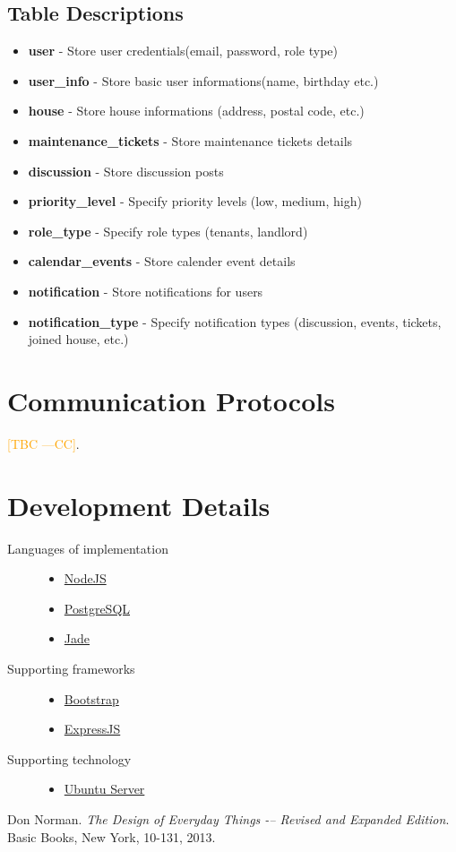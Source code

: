 \documentclass[12pt]{article}
\newcommand{\authornote}[3]{\textcolor{#1}{[#3 ---#2]}}
\newcommand{\authornote}[3]{}
\newcommand{\cc}[1]{\authornote{orange}{CC}{#1}}
\begin{document}
\subsection{Table Descriptions}
\begin{itemize}
    \item \textbf{user} - Store user credentials(email, password, role type)
    \item \textbf{user\_info} - Store basic user informations(name, birthday etc.)
    \item \textbf{house} - Store house informations (address, postal code, etc.)
    \item \textbf{maintenance\_tickets} - Store maintenance tickets details
    \item \textbf{discussion} - Store discussion posts
    \item \textbf{priority\_level} - Specify priority levels (low, medium, high)
    \item \textbf{role\_type} - Specify role types (tenants, landlord)
    \item \textbf{calendar\_events} - Store calender event details
    \item \textbf{notification} - Store notifications for users
    \item \textbf{notification\_type} - Specify notification types (discussion, events, tickets, joined house, etc.)

\end{itemize}

\section{Communication Protocols}
\cc{TBC}.

%
\section{Development Details}
\begin{description}
  \item[Languages of implementation] \hfill
    \begin{itemize}
      \item \href{https://nodejs.org/en/}{NodeJS}
      \item \href{http://www.postgresql.org/}{PostgreSQL}
      \item \href{http://jade-lang.com/}{Jade}
    \end{itemize}
  \item[Supporting frameworks] \hfill
    \begin{itemize}
      \item \href{http://getbootstrap.com/}{Bootstrap}
      \item \href{http://expressjs.com/}{ExpressJS}
    \end{itemize}
  \item[Supporting technology] \hfill
    \begin{itemize}
      \item \href{http://www.ubuntu.com/server}{Ubuntu Server}
    \end{itemize}
\end{description}

\begin{thebibliography}{9}
Don Norman.
\textit{The Design of Everyday Things -– Revised and Expanded Edition}.
Basic Books, New York, 10-131, 2013.
\end{thebibliography}
\end{document}
